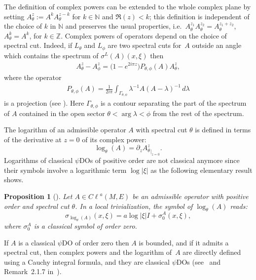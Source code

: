 \documentclass[11pt]{article}
\newtheorem{proposition}{Proposition}
\newcommand{\N}{{\mathbb N}}
\newcommand{\Z}{{\mathbb Z}}
\def \Cl {{C\ell}}
\begin{document}
The def\/inition of complex powers can be extended to the whole complex plane by setting $A_{\theta}^z:=A^kA_{\theta}^{z-k}$ for $k\in \N$ and $\Re(z)<k$; this def\/inition is independent of the choice of $k$ in $\N$ and preserves the usual properties, i.e.\ $A_{\theta}^{z_1}A_{\theta}^{z_2}=A_{\theta}^{z_1+z_2}$, $A_{\theta}^k=A^k$, for $k\in\Z$.
Complex powers of operators depend on the choice of spectral cut. Indeed, if $L_{\theta}$ and $L_{\phi}$ are two spectral cuts for~$A$ outside an angle which contains the spectrum of $\sigma^L(A)(x,\xi)$ then
\begin{gather}
A_\theta^z-A_\phi^z=\big(1-e^{2i\pi z} \big)  P_{\theta, \phi} (A) A_\theta^z, \label{eq:DifferenceComplexPowers}
\end{gather}
where the operator
\begin{gather}
 P_{\theta, \phi} (A)=\frac{1}{2i\pi} \int_{\Gamma_{\theta,\phi}}\lambda^{-1}A(A-\lambda)^{-1}\,d\lambda \label{projection}
\end{gather}
is a projection (see \cite{PongeAsymmetry, WodzickiThesis}). Here $\Gamma_{\theta,\phi}$ is a contour separating the part of the spectrum of $A$ contained in the open sector $\theta<\arg\lambda<\phi$ from the rest of the spectrum.

The logarithm  of an admissible operator $A$ with spectral cut $\theta$  is def\/ined in terms of the derivative at $z=0$ of its complex power:
\[
\log_\theta(A)= \partial_z {A_\theta^{z}} _{\vert_{z=0}}.
\]
Logarithms of classical $\psi$DOs of positive order are not classical anymore since their symbols involve a logarithmic term $\log\vert \xi\vert$ as the following elementary result shows.

\begin{proposition}[\cite{okikiolu}]\label{prop:leadsymbolsigmathetaA}
Let $A\in \Cl^{a}(M, E)$ be an admissible operator with positive order and spectral cut $\theta$. In a local trivialization, the symbol of $\log_\theta(A)$ reads:
\[
\sigma_{\log_\theta(A)}(x, \xi)=a  \log \vert \xi\vert  I +\sigma_0^A(x,\xi),
\]
where $\sigma_0^A$ is a classical symbol of order zero.
\end{proposition}

\begin{remark}
If $A$ is a classical $\psi$DO of order zero then $A$ is bounded, and if it admits a spectral cut, then complex powers and the logarithm of~$A$ are directly def\/ined using a Cauchy integral formula, and they are classical $\psi$DOs (see~\cite{okikiolu} and Remark~2.1.7 in~\cite{ouedraogothese}).
\end{remark}
\end{document}
